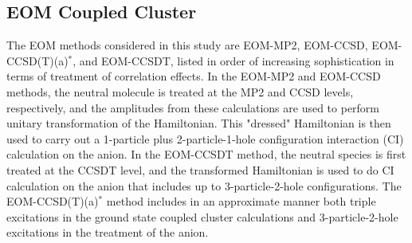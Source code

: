 \subsection{EOM Coupled Cluster}
\label{sub:EOM}
The EOM methods considered in this study are EOM-MP2,\cite{10.1063/1.469817} EOM-CCSD,\cite{10.1016/0009-26149389023-B} EOM-CCSD(T)(a)$^*$,\cite{10.1063/1.4962910} and EOM-CCSDT,\cite{10.1063/1.1416173,10.1063/1.1378323} listed in order of increasing sophistication in terms of treatment of correlation effects. 
In the EOM-MP2 and EOM-CCSD methods, the neutral molecule is treated at the MP2 and CCSD levels, respectively, and the amplitudes from these calculations are used to perform unitary transformation of the Hamiltonian.
This "dressed" Hamiltonian is then used to carry out a 1-particle plus 2-particle-1-hole configuration interaction (CI) calculation on the anion.
In the EOM-CCSDT method, the neutral species is first treated at the CCSDT level, and the transformed Hamiltonian is used to do CI calculation on the anion that includes up to 3-particle-2-hole configurations.
The EOM-CCSD(T)(a)$^*$ method includes in an approximate manner both triple excitations in the ground state coupled cluster calculations and 3-particle-2-hole excitations in the treatment of the anion.\cite{10.1063/1.4962910}

